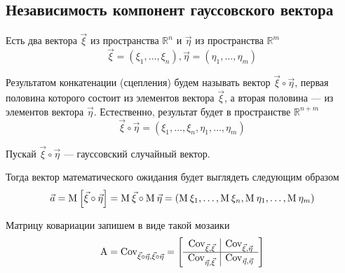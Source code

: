 \subsection{Независимость компонент гауссовского вектора}

\begin{definition}
  Есть два вектора $\vec{\xi}$ из пространства $\mathbb{R}^n$ и $\vec{\eta}$
  из пространства $\mathbb{R}^m$
  $$\vec{\xi} = \left( \xi_1, \dots, \xi_n \right),
      \vec{\eta} = \left( \eta_1, \dots, \eta_m \right)$$

  Результатом конкатенации (сцепления) будем называть вектор
  $\vec{\xi} \circ \vec{\eta}$, первая половина которого состоит из
  элементов вектора $\vec{\xi}$, а вторая половина --- из элементов вектора
  $\vec{\eta}$. Естественно, результат будет в пространстве $\mathbb{R}^{n+m}$
  $$\vec{\xi} \circ \vec{\eta}
      = \left( \xi_1, \dots, \xi_n, \eta_1, \dots, \eta_m \right)$$
\end{definition}

Пускай $\vec{\xi} \circ \vec{\eta}$ --- гауссовский случайный вектор.

Тогда вектор математического ожидания будет выглядеть следующим образом
$$\vec{a}
  = \operatorname{M}_{} \left[ \vec{\xi} \circ \vec{\eta} \right]
  = \operatorname{M}_{} \vec{\xi} \circ \operatorname{M}_{} \vec{\eta}
  = \left( \operatorname{M}_{} \xi_1, \dots, \operatorname{M}_{} \xi_n,
      \operatorname{M}_{} \eta_1, \dots, \operatorname{M}_{} \eta_m \right)$$

Матрицу ковариации запишем в виде такой мозаики
\begin{equation}\label{eq:covMatrix:mozaik}
  \operatorname{A}
  = \operatorname{Cov}^{}_{\vec{\xi} \circ \vec{\eta}, \vec{\xi} \circ \vec{\eta}}
  = \left[ \begin{array}{r|l}
      \operatorname{Cov}^{}_{\vec{\xi}, \vec{\xi}} & \operatorname{Cov}^{}_{\vec{\xi}, \vec{\eta}} \\
      \hline
      \operatorname{Cov}^{}_{\vec{\eta}, \vec{\xi}} & \operatorname{Cov}^{}_{\vec{\eta}, \vec{\eta}} \\
      \end{array} \right]
\end{equation}

